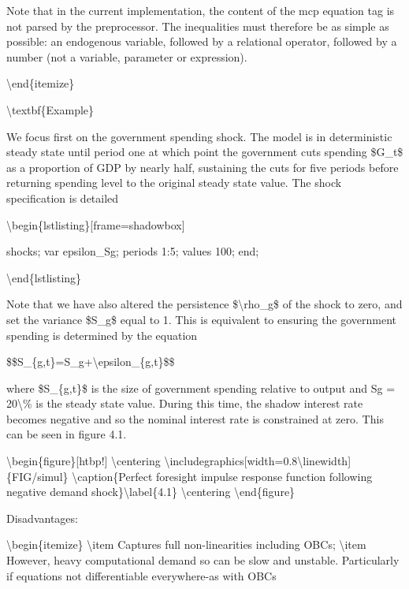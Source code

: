 \documentclass[10pt,math=newtx,citestyle=gb7714-2015,bibstyle=gb7714-2015]{elegantbook}
\begin{document}
	Note that in the current implementation, the content of the mcp equation tag is not parsed by the preprocessor. The inequalities must therefore be as simple as possible: an endogenous variable, followed by a relational operator, followed by a number (not a variable, parameter or expression).
	
	\textbackslash{}end\{itemize\}
	
	\textbackslash{}textbf\{Example\}
	
	We focus first on the government spending shock. The model is in deterministic steady state until period one at which point the government cuts spending \$G\_t\$ as a proportion of GDP by nearly half, sustaining the cuts for five periods before returning spending level to the original steady state value. The shock
	specification is detailed
	
	\textbackslash{}begin\{lstlisting\}[frame=shadowbox]
	
	shocks;
	var epsilon\_Sg;
	periods 1:5;
	values 100;
	end;
	
	\textbackslash{}end\{lstlisting\}
	
	Note that we have also altered the persistence \$\textbackslash{}rho\_g\$ of the shock to zero, and set the variance \$S\_g\$ equal to 1. This is
	equivalent to ensuring the government spending is determined by the equation
	
	\$\$S\_\{g,t\}=S\_g+\textbackslash{}epsilon\_\{g,t\}\$\$
	
	where \$S\_\{g,t\}\$ is the size of government spending relative to output and Sg = 20\textbackslash{}\% is the steady state value. During this time, the shadow interest rate becomes negative and so the nominal interest rate is constrained at zero. This can be
	seen in figure 4.1.
	
	\textbackslash{}begin\{figure\}[htbp!]
	\textbackslash{}centering
	\textbackslash{}includegraphics[width=0.8\textbackslash{}linewidth]\{FIG/simul\}
	\textbackslash{}caption\{Perfect foresight impulse response function following negative demand shock\}\textbackslash{}label\{4.1\}
	\textbackslash{}centering
	\textbackslash{}end\{figure\}
	
	Disadvantages:
	
	\textbackslash{}begin\{itemize\}
	\textbackslash{}item Captures full non-linearities including OBCs;
	\textbackslash{}item However, heavy computational demand so can be slow and unstable. Particularly if equations not differentiable everywhere-as with OBCs
	
\end{document}
